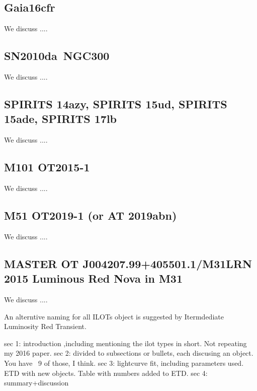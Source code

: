 \documentclass[modern]{aastex63}
\begin{document}
\subsection{Gaia16cfr}
We discuss .... \cite{2018MNRAS.473.4805K}

\subsection{SN2010da~NGC300}
We discuss .... \cite{2016ApJ...830...11V}


\subsection{SPIRITS 14azy, SPIRITS 15ud, SPIRITS 15ade, SPIRITS 17lb}
We discuss .... \cite{2019ApJ...886...40J}

\subsection{M101 OT2015-1}
We discuss .... \cite{2017ApJ...834..107B}


\subsection{M51 OT2019-1 (or AT 2019abn)}
We discuss .... \cite{2019ApJ...880L..20J}

\subsection{MASTER OT J004207.99+405501.1/M31LRN 2015 Luminous Red Nova in M31}
We discuss .... \cite{2017MNRAS.470.2339L}


An alterntive naming for all ILOTs object is suggested by \cite{2009ApJ...695L.154B} Itermdediate Luminosity Red Transient. 

sec 1: introduction ,including mentioning the ilot types in short. Not repeating my 2016 paper.
sec 2: divided to subsections or bullets, each discusing an object. You have ~9 of those, I think.
sec 3: lightcurve fit, including parameters used. ETD with new objects. Table with numbers added to ETD.
sec 4: summary+discussion
\end{document}

